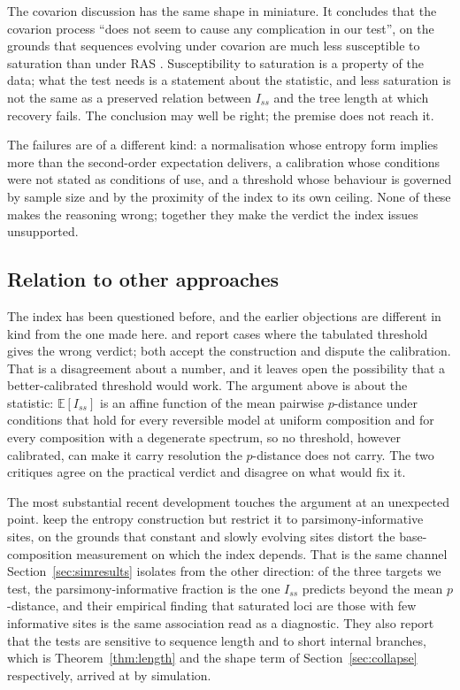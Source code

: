 \documentclass[11pt]{article}
\newcommand{\Iss}{I_{ss}}
\newcommand{\E}{\mathbb{E}}
\theoremstyle{definition}
\theoremstyle{remark}
\begin{document}
The covarion discussion has the same shape in miniature. It concludes that the
covarion process ``does not seem to cause any complication in our test'', on the
grounds that sequences evolving under covarion are much less susceptible to
saturation than under RAS \citep{penny2001mathematical}. Susceptibility to
saturation is a property of the data; what the test needs is a statement about
the statistic, and less saturation is not the same as a preserved relation
between $\Iss$ and the tree length at which recovery fails. The conclusion may
well be right; the premise does not reach it.

The failures are of a different kind: a normalisation whose entropy form
implies more than the second-order expectation delivers, a calibration whose
conditions were not stated as conditions of use, and a threshold whose
behaviour is governed by sample size and by the proximity of the index to its
own ceiling. None of these makes the reasoning wrong; together they make the
verdict the index issues unsupported.

\subsection{Relation to other approaches}
\label{sec:related}

The index has been questioned before, and the earlier objections are
different in kind from the one made here. \citet{verbruggen2007codium} and
\citet{letsch2011rrna} report cases where the tabulated threshold gives the
wrong verdict; both accept the construction and dispute the calibration.
That is a disagreement about a number, and it leaves open the possibility that
a better-calibrated threshold would work. The argument above is about the
statistic: $\E[\Iss]$ is an affine function of the mean pairwise $p$-distance
under conditions that hold for every reversible model at uniform composition
and for every composition with a degenerate spectrum, so no threshold, however
calibrated, can make it carry resolution the $p$-distance does not carry. The
two critiques agree on the practical verdict and disagree on what would fix
it.

The most substantial recent development touches the argument at an
unexpected point. \citet{duchene2022saturation} keep the entropy construction
but restrict it to parsimony-informative sites, on the grounds that constant
and slowly evolving sites distort the base-composition measurement on which
the index depends. That is the same channel Section~\ref{sec:simresults}
isolates from the other direction: of the three targets we test, the
parsimony-informative fraction is the one $\Iss$ predicts beyond the mean
$p$-distance, and their empirical finding that saturated loci are those with
few informative sites is the same association read as a diagnostic. They also
report that the tests are sensitive to sequence length and to short internal
branches, which is Theorem~\ref{thm:length} and the shape term of
Section~\ref{sec:collapse} respectively, arrived at by simulation.
\end{document}
